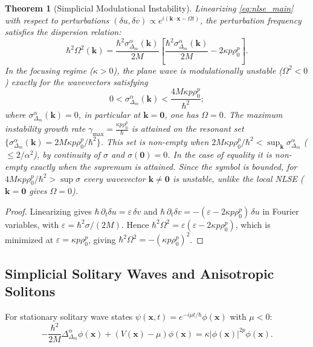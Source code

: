 \documentclass[11pt,a4paper]{article}
\theoremstyle{plain}
\newtheorem{theorem}{Theorem}[section]
\theoremstyle{definition}
\theoremstyle{remark}
\numberwithin{equation}{section}
\begin{document}
\begin{theorem}[Simplicial Modulational Instability]
\label{thm:modulational_instability}
Linearizing \eqref{eq:nlse_main} with respect to perturbations $(\delta u, \delta v) \propto e^{i(\mathbf{k}\cdot\mathbf{x} - \Omega t)}$, the perturbation frequency satisfies the dispersion relation:
\begin{equation}
\hbar^2 \Omega^2(\mathbf{k}) = \frac{\hbar^2 \sigma_{\Delta_m}^\alpha(\mathbf{k})}{2M} \left[ \frac{\hbar^2 \sigma_{\Delta_m}^\alpha(\mathbf{k})}{2M} - 2\kappa p \rho_0^p \right].
\end{equation}
In the focusing regime ($\kappa > 0$), the plane wave is modulationally unstable ($\Omega^2 < 0$) exactly for the wavevectors satisfying
\begin{equation}
0 < \sigma_{\Delta_m}^\alpha(\mathbf{k}) < \frac{4M\kappa p \rho_0^p}{\hbar^2};
\end{equation}
where $\sigma_{\Delta_m}^\alpha(\mathbf{k}) = 0$, in particular at $\mathbf{k} = \mathbf{0}$, one has $\Omega = 0$.
The maximum instability growth rate $\gamma_{\max} = \frac{\kappa p \rho_0^p}{\hbar}$ is attained on the resonant set $\{\sigma_{\Delta_m}^\alpha(\mathbf{k}) = 2M\kappa p\rho_0^p/\hbar^2\}$. This set is non-empty when $2M\kappa p\rho_0^p/\hbar^2 < \sup_{\mathbf{k}}\sigma_{\Delta_m}^\alpha$ ($\le 2/\alpha^2$), by continuity of $\sigma$ and $\sigma(\mathbf{0}) = 0$. In the case of equality it is non-empty exactly when the supremum is attained. Since the symbol is bounded, for $4M\kappa p\rho_0^p/\hbar^2 > \sup\sigma$ \emph{every} wavevector $\mathbf{k} \ne \mathbf{0}$ is unstable, unlike the local NLSE ($\mathbf{k} = \mathbf{0}$ gives $\Omega = 0$).
\end{theorem}
\begin{proof}
Linearizing gives $\hbar\,\partial_t \delta u = \varepsilon\,\delta v$ and $\hbar\,\partial_t \delta v = -(\varepsilon - 2\kappa p\rho_0^p)\,\delta u$ in Fourier variables, with $\varepsilon = \hbar^2\sigma/(2M)$. Hence $\hbar^2\Omega^2 = \varepsilon(\varepsilon - 2\kappa p\rho_0^p)$, which is minimized at $\varepsilon = \kappa p\rho_0^p$, giving $\hbar^2\Omega^2 = -(\kappa p\rho_0^p)^2$.
\end{proof}

\subsection{Simplicial Solitary Waves and Anisotropic Solitons}

For stationary solitary wave states $\psi(\mathbf{x}, t) = e^{-i\mu t/\hbar} \phi(\mathbf{x})$ with $\mu < 0$:
\begin{equation}
\label{eq:soliton_profile}
-\frac{\hbar^2}{2M}\Delta_{\Delta_m}^\alpha \phi(\mathbf{x}) + (V(\mathbf{x}) - \mu)\phi(\mathbf{x}) = \kappa |\phi(\mathbf{x})|^{2p}\phi(\mathbf{x}).
\end{equation}
\end{document}
